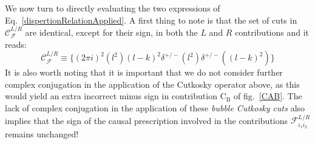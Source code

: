 \documentclass[11pt]{article}
\begin{document}
We now turn to directly evaluating the two expressions of Eq.~\ref{dispertionRelationApplied}. 
A first thing to note is that the set of cuts in $\mathcal{C}_\mathcal{F}^{L/R}$ are identical, except for their sign, in both the $L$ and $R$ contributions and it reads:
\begin{equation}
\mathcal{C}_\mathcal{F}^{L/R} \equiv \{ (2\pi i)^2 (l^2) (l-k)^2 \delta^{+/-}\left(l^2\right)\delta^{+/-}\left((l-k)^2\right)\}
\end{equation}
It is also worth noting that it is important that we do not consider further complex conjugation in the application of the Cutkosky operator above, as this would yield an extra incorrect minus sign in contribution $\textrm{C}_\textrm{B}$ of fig.~\ref{CAB}. The lack of complex conjugation in the application of these \emph{bubble Cutkosky cuts} also implies that the sign of the causal prescription involved in the contributions $\mathcal{F}^{L/R}_{i_1 i_2}$ remains unchanged!
\end{document}
